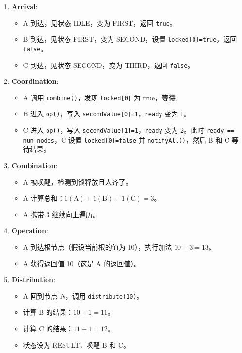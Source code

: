 \documentclass[UTF8,a4paper,12pt]{ctexart}
\begin{document}
\begin{enumerate}
    \item \textbf{Arrival}: 
    \begin{itemize}
        \item A 到达，见状态 IDLE，变为 FIRST，返回 \texttt{true}。
        \item B 到达，见状态 FIRST，变为 SECOND，设置 \texttt{locked[0]=true}，返回 \texttt{false}。
        \item C 到达，见状态 SECOND，变为 THIRD，返回 \texttt{false}。
    \end{itemize}
    
    \item \textbf{Coordination}:
    \begin{itemize}
        \item A 调用 \texttt{combine()}，发现 \texttt{locked[0]} 为 true，\textbf{等待}。
        \item B 进入 \texttt{op()}，写入 \texttt{secondValue[0]=1}，\texttt{ready} 变为 1。
        \item C 进入 \texttt{op()}，写入 \texttt{secondValue[1]=1}，\texttt{ready} 变为 2。此时 \texttt{ready == num\_nodes}，C 设置 \texttt{locked[0]=false} 并 \texttt{notifyAll()}，然后 B 和 C 等待结果。
    \end{itemize}
    
    \item \textbf{Combination}:
    \begin{itemize}
        \item A 被唤醒，检测到锁释放且人齐了。
        \item A 计算总和：$1 (\text{A}) + 1 (\text{B}) + 1 (\text{C}) = 3$。
        \item A 携带 3 继续向上遍历。
    \end{itemize}
    
    \item \textbf{Operation}:
    \begin{itemize}
        \item A 到达根节点（假设当前根的值为 10），执行加法 $10 + 3 = 13$。
        \item A 获得返回值 10（这是 A 的返回值）。
    \end{itemize}
    
    \item \textbf{Distribution}:
    \begin{itemize}
        \item A 回到节点 $N$，调用 \texttt{distribute(10)}。
        \item 计算 B 的结果：$10 + 1 = 11$。
        \item 计算 C 的结果：$11 + 1 = 12$。
        \item 状态设为 RESULT，唤醒 B 和 C。
    \end{itemize}
    

\end{enumerate}
\end{document}
